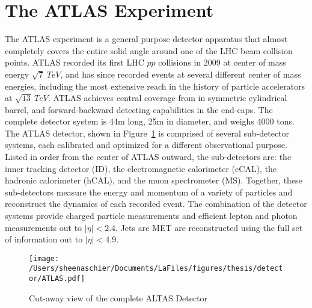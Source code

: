 \section{The ATLAS Experiment}

The ATLAS experiment is a general purpose detector apparatus that almost completely covers the entire solid angle around one of the LHC beam collision points.  ATLAS recorded its first LHC $pp$ collisions in 2009 at center of mass energy $\sqrt{7}~TeV$, and has since recorded events at several different center of mass energies, including the most extensive reach in the history of particle accelerators at $\sqrt{13}~TeV$.  %
ATLAS achieves central coverage from in symmetric cylindrical barrel, and forward-backward detecting capabilities in the end-caps.  The complete detector system is 44m long, 25m in diameter, and weighs 4000 tons.  The ATLAS detector, shown in Figure~\ref{fig:ATLAS} is comprised of several sub-detector systems, each calibrated and optimized for a different observational purpose.  Listed in order from the center of ATLAS outward, the sub-detectors are: the inner tracking detector (ID), the electromagnetic calorimeter (eCAL), the hadronic calorimeter (hCAL), and the muon spectrometer (MS).  Together, these sub-detectors measure the energy and momentum of a variety of particles and reconstruct the dynamics of each recorded event.  The combination of the detector systems provide charged particle measurements and efficient lepton and photon measurements out to $|\eta| < 2.4$.  Jets are MET are reconstructed using the full set of information out to $|\eta| < 4.9$.  
  \begin{figure}[tbp]
  \centering
 \texttt{[image: /Users/sheenaschier/Documents/LaFiles/figures/thesis/detector/ATLAS.pdf]}
    \caption{Cut-away view of the complete ALTAS Detector}
   \label{fig:ATLAS}
 \end{figure}


